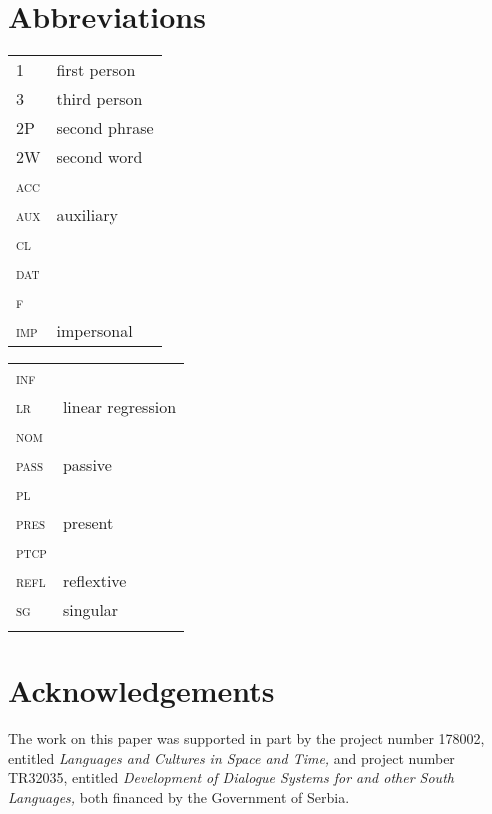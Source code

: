 \documentclass[output=paper,modfonts,newtxmath,hidelinks,]{langscibook}
\begin{document}
\section*{Abbreviations}

\begin{tabularx}{.5\textwidth}{@{}lQ@{}}
\textsc{1}&first person\\
\textsc{3}&third person\\
2P&second phrase\\
2W&second word\\
\textsc{acc}&\\
\textsc{aux}&auxiliary\\
\textsc{cl}&\\
\textsc{dat}&\\
\textsc{f}&\\
\textsc{imp}&impersonal\\
\end{tabularx}%
\begin{tabularx}{.5\textwidth}{@{}lQ@{}}
\textsc{inf}&\\
\textsc{lr}&linear regression\\
\textsc{nom}&\\
\textsc{pass}&passive\\
\textsc{pl}&\\
 \textsc{pres}&present\\
\textsc{ptcp}&\\
\textsc{refl}&reflextive\\
\textsc{sg}&singular\\
&\\
\end{tabularx}

\section*{Acknowledgements}

The work on this paper was supported in part by the project number 178002, entitled \textit{Languages and Cultures in Space and Time,} and project number TR32035, entitled \textit{Development of Dialogue Systems for  and other South  Languages,} both financed by the Government of Serbia.
\sloppy
\printbibliography[heading=subbibliography,notkeyword=this]
\end{document}
